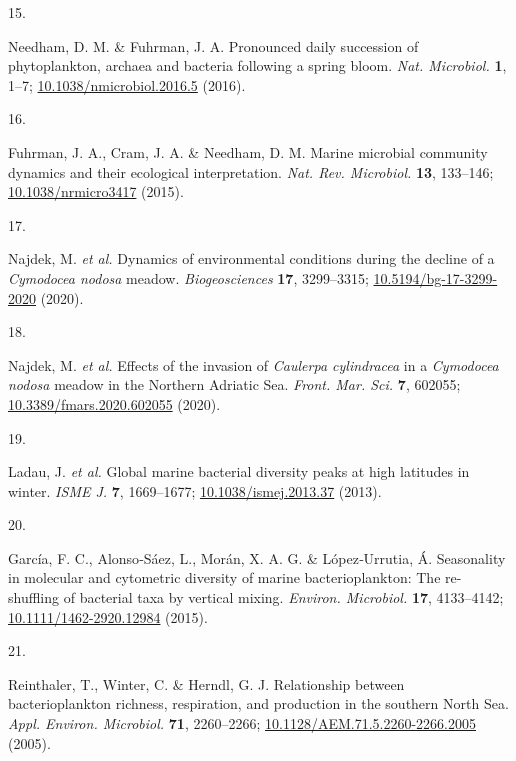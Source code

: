 \documentclass[
  12pt,
]{article}
\newlength{\cslhangindent}
\newlength{\csllabelwidth}
\newlength{\cslentryspacingunit} %
\newenvironment{CSLReferences}[2] %
 {%
  \setlength{\parindent}{0pt}
  \ifodd #1
  \let\oldpar\par
  \def\par{\hangindent=\cslhangindent\oldpar}
  \fi
  \setlength{\parskip}{#2\cslentryspacingunit}
 }%
 {}
\newcommand{\CSLLeftMargin}[1]{\parbox[t]{\csllabelwidth}{#1}}
\newcommand{\CSLRightInline}[1]{\parbox[t]{\linewidth - \csllabelwidth}{#1}\break}
\begin{document}
\begin{CSLReferences}{0}{0}
\leavevmode{}%
\CSLLeftMargin{15. }
\CSLRightInline{Needham, D. M. \& Fuhrman, J. A. Pronounced daily
succession of phytoplankton, archaea and bacteria following a spring
bloom. \emph{Nat. Microbiol.} \textbf{1}, 1--7;
\href{https://doi.org/10.1038/nmicrobiol.2016.5}{10.1038/nmicrobiol.2016.5}
(2016).}

\leavevmode{}%
\CSLLeftMargin{16. }
\CSLRightInline{Fuhrman, J. A., Cram, J. A. \& Needham, D. M. Marine
microbial community dynamics and their ecological interpretation.
\emph{Nat. Rev. Microbiol.} \textbf{13}, 133--146;
\href{https://doi.org/10.1038/nrmicro3417}{10.1038/nrmicro3417} (2015).}

\leavevmode{}%
\CSLLeftMargin{17. }
\CSLRightInline{Najdek, M. \emph{et al.} Dynamics of environmental
conditions during the decline of a {\emph{Cymodocea nodosa}} meadow.
\emph{Biogeosciences} \textbf{17}, 3299--3315;
\href{https://doi.org/10.5194/bg-17-3299-2020}{10.5194/bg-17-3299-2020}
(2020).}

\leavevmode{}%
\CSLLeftMargin{18. }
\CSLRightInline{Najdek, M. \emph{et al.} Effects of the invasion of
{\emph{Caulerpa cylindracea}} in a {\emph{Cymodocea nodosa}} meadow in
the {Northern Adriatic Sea}. \emph{Front. Mar. Sci.} \textbf{7}, 602055;
\href{https://doi.org/10.3389/fmars.2020.602055}{10.3389/fmars.2020.602055}
(2020).}

\leavevmode{}%
\CSLLeftMargin{19. }
\CSLRightInline{Ladau, J. \emph{et al.} Global marine bacterial
diversity peaks at high latitudes in winter. \emph{ISME J.} \textbf{7},
1669--1677;
\href{https://doi.org/10.1038/ismej.2013.37}{10.1038/ismej.2013.37}
(2013).}

\leavevmode{}%
\CSLLeftMargin{20. }
\CSLRightInline{García, F. C., Alonso‐Sáez, L., Morán, X. A. G. \&
López‐Urrutia, Á. Seasonality in molecular and cytometric diversity of
marine bacterioplankton: The re-shuffling of bacterial taxa by vertical
mixing. \emph{Environ. Microbiol.} \textbf{17}, 4133--4142;
\href{https://doi.org/10.1111/1462-2920.12984}{10.1111/1462-2920.12984}
(2015).}

\leavevmode{}%
\CSLLeftMargin{21. }
\CSLRightInline{Reinthaler, T., Winter, C. \& Herndl, G. J. Relationship
between bacterioplankton richness, respiration, and production in the
southern {North Sea}. \emph{Appl. Environ. Microbiol.} \textbf{71},
2260--2266;
\href{https://doi.org/10.1128/AEM.71.5.2260-2266.2005}{10.1128/AEM.71.5.2260-2266.2005}
(2005).}


\end{CSLReferences}
\end{document}
